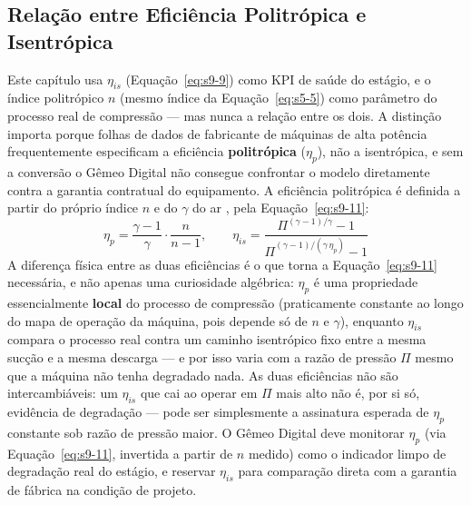 \documentclass[12pt,a4paper]{article}
\numberwithin{equation}{section}
\numberwithin{table}{section}
\numberwithin{figure}{section}
\begin{document}
	\subsection{\textbf{Relação entre Eficiência Politrópica e Isentrópica}}
	Este capítulo usa $\eta_{is}$ (Equação~\eqref{eq:s9-9}) como KPI de saúde do estágio, e o índice politrópico $n$ (mesmo índice da Equação~\eqref{eq:s5-5}) como parâmetro do processo real de compressão — mas nunca a relação entre os dois. A distinção importa porque folhas de dados de fabricante de máquinas de alta potência frequentemente especificam a eficiência \textbf{politrópica} ($\eta_p$), não a isentrópica, e sem a conversão o Gêmeo Digital não consegue confrontar o modelo diretamente contra a garantia contratual do equipamento. A eficiência politrópica é definida a partir do próprio índice $n$ e do $\gamma$ do ar \cite{moran, cengel, hanlon}, pela Equação~\eqref{eq:s9-11}:
	\begin{equation}\label{eq:s9-11}
 \eta_p = \frac{\gamma - 1}{\gamma} \cdot \frac{n}{n - 1}, \qquad
 \eta_{is} = \frac{\Pi^{(\gamma-1)/\gamma} - 1}{\Pi^{(\gamma-1)/(\gamma\,\eta_p)} - 1}
\end{equation}
	A diferença física entre as duas eficiências é o que torna a Equação~\eqref{eq:s9-11} necessária, e não apenas uma curiosidade algébrica: $\eta_p$ é uma propriedade essencialmente \textbf{local} do processo de compressão (praticamente constante ao longo do mapa de operação da máquina, pois depende só de $n$ e $\gamma$), enquanto $\eta_{is}$ compara o processo real contra um caminho isentrópico fixo entre a mesma sucção e a mesma descarga — e por isso varia com a razão de pressão $\Pi$ mesmo que a máquina não tenha degradado nada. As duas eficiências não são intercambiáveis: um $\eta_{is}$ que cai ao operar em $\Pi$ mais alto não é, por si só, evidência de degradação — pode ser simplesmente a assinatura esperada de $\eta_p$ constante sob razão de pressão maior. O Gêmeo Digital deve monitorar $\eta_p$ (via Equação~\eqref{eq:s9-11}, invertida a partir de $n$ medido) como o indicador limpo de degradação real do estágio, e reservar $\eta_{is}$ para comparação direta com a garantia de fábrica na condição de projeto.
\end{document}
